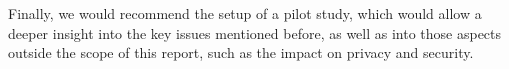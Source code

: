 \documentclass[a4paper,11pt]{article}
\begin{document}
Finally, we would recommend the setup of a pilot study, which would allow 
a deeper insight into the key issues mentioned before, as well as into those aspects 
outside the scope of this report, such as the impact on privacy and security. 



\end{document}
